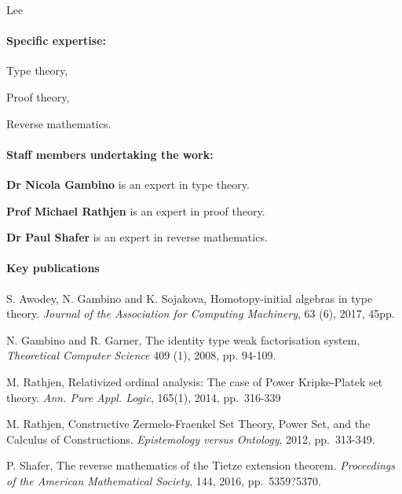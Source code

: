 \begin{sitedescription}{Lee}
\paragraph{Specific expertise:}

\begin{compactitem}
\item Type theory,
\item Proof theory,
\item Reverse mathematics.
\end{compactitem}

\paragraph{Staff members undertaking the work:}

\begin{compactitem}
\item \textbf{Dr Nicola Gambino} is an expert in type theory.
\item \textbf{Prof Michael Rathjen} is an expert in proof theory.
\item \textbf{Dr Paul Shafer} is an expert in reverse mathematics.
\end{compactitem}


\paragraph{Key publications} 

\begin{compactitem}
\item S. Awodey, N. Gambino and K. Sojakova, Homotopy-initial algebras in type theory. 
{\em Journal of the Association for Computing Machinery}, 63 (6), 2017, 45pp.
\item N. Gambino and R. Garner, The identity type weak factorisation system, 
{\em Theoretical Computer Science} 409 (1), 2008, pp. 94-109.
\item M. Rathjen, Relativized ordinal analysis: The case of Power Kripke-Platek set theory. 
{\em Ann. Pure Appl. Logic}, 165(1), 2014, pp.~316-339 
\item M. Rathjen,
Constructive Zermelo-Fraenkel Set Theory, Power Set, and the Calculus of Constructions. 
{\em Epistemology versus Ontology}, 2012, pp.~313-349. 
\item P. Shafer,
The reverse mathematics of the Tietze extension theorem.  
{\em Proceedings of the American Mathematical Society}, 144, 2016, pp.~5359?5370.
\end{compactitem}

\end{sitedescription}

